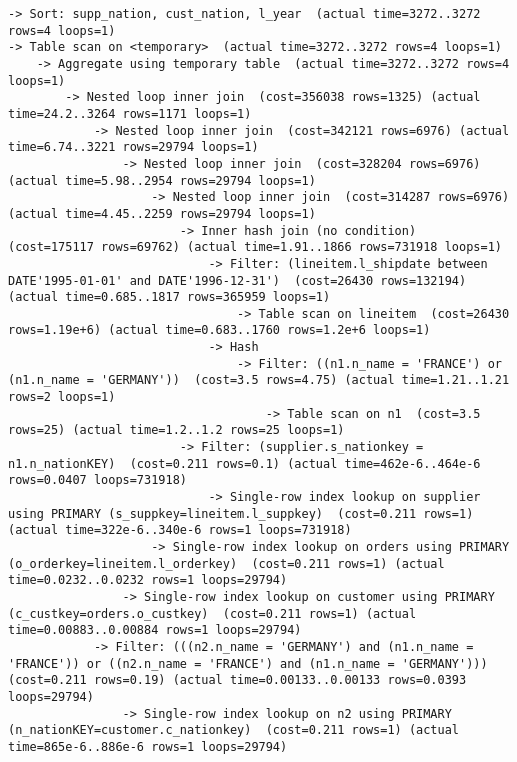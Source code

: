 \documentclass{article}
\begin{document}
\begin{lstlisting}
-> Sort: supp_nation, cust_nation, l_year  (actual time=3272..3272 rows=4 loops=1)
-> Table scan on <temporary>  (actual time=3272..3272 rows=4 loops=1)
    -> Aggregate using temporary table  (actual time=3272..3272 rows=4 loops=1)
        -> Nested loop inner join  (cost=356038 rows=1325) (actual time=24.2..3264 rows=1171 loops=1)
            -> Nested loop inner join  (cost=342121 rows=6976) (actual time=6.74..3221 rows=29794 loops=1)
                -> Nested loop inner join  (cost=328204 rows=6976) (actual time=5.98..2954 rows=29794 loops=1)
                    -> Nested loop inner join  (cost=314287 rows=6976) (actual time=4.45..2259 rows=29794 loops=1)
                        -> Inner hash join (no condition)  (cost=175117 rows=69762) (actual time=1.91..1866 rows=731918 loops=1)
                            -> Filter: (lineitem.l_shipdate between DATE'1995-01-01' and DATE'1996-12-31')  (cost=26430 rows=132194) (actual time=0.685..1817 rows=365959 loops=1)
                                -> Table scan on lineitem  (cost=26430 rows=1.19e+6) (actual time=0.683..1760 rows=1.2e+6 loops=1)
                            -> Hash
                                -> Filter: ((n1.n_name = 'FRANCE') or (n1.n_name = 'GERMANY'))  (cost=3.5 rows=4.75) (actual time=1.21..1.21 rows=2 loops=1)
                                    -> Table scan on n1  (cost=3.5 rows=25) (actual time=1.2..1.2 rows=25 loops=1)
                        -> Filter: (supplier.s_nationkey = n1.n_nationKEY)  (cost=0.211 rows=0.1) (actual time=462e-6..464e-6 rows=0.0407 loops=731918)
                            -> Single-row index lookup on supplier using PRIMARY (s_suppkey=lineitem.l_suppkey)  (cost=0.211 rows=1) (actual time=322e-6..340e-6 rows=1 loops=731918)
                    -> Single-row index lookup on orders using PRIMARY (o_orderkey=lineitem.l_orderkey)  (cost=0.211 rows=1) (actual time=0.0232..0.0232 rows=1 loops=29794)
                -> Single-row index lookup on customer using PRIMARY (c_custkey=orders.o_custkey)  (cost=0.211 rows=1) (actual time=0.00883..0.00884 rows=1 loops=29794)
            -> Filter: (((n2.n_name = 'GERMANY') and (n1.n_name = 'FRANCE')) or ((n2.n_name = 'FRANCE') and (n1.n_name = 'GERMANY')))  (cost=0.211 rows=0.19) (actual time=0.00133..0.00133 rows=0.0393 loops=29794)
                -> Single-row index lookup on n2 using PRIMARY (n_nationKEY=customer.c_nationkey)  (cost=0.211 rows=1) (actual time=865e-6..886e-6 rows=1 loops=29794)
\end{lstlisting}
\end{document}
